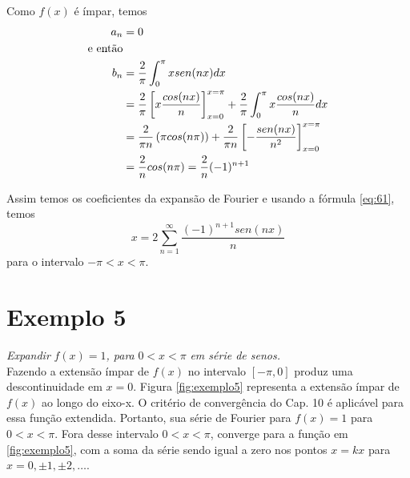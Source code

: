 Como $f(x)$ é ímpar, temos
\begin{equation}
    \notag
    \begin{split}
        a_n &= 0\\
        \text{e então}&\\
        b_n &= \dfrac{2}{\pi}\int_{0}^{\pi}x sen(nx)dx\\
        &= \dfrac{2}{\pi}\left[x \dfrac{cos(nx)}{n}\right]_{x=0}^{x=\pi} + \dfrac{2}{\pi}\int_{0}^{\pi}x \dfrac{cos(nx)}{n}dx\\
        &= \dfrac{2}{\pi n} \left(\pi cos(n\pi)\right) + \dfrac{2}{\pi n}\left[-\dfrac{sen(nx)}{n^2}\right]_{x=0}^{x=\pi}\\
        &= \dfrac{2}{n} cos(n\pi) = \dfrac{2}{n} (-1)^{n+1}
    \end{split}
\end{equation}

Assim temos os coeficientes da expansão de Fourier e usando a fórmula \ref{eq:61}, temos
\begin{equation}
\label{eq:exemplo4SF}
    x = 2\sum\limits_{n=1}^{\infty}\dfrac{(-1)^{n + 1}sen(nx)}{n}
\end{equation}
para o intervalo $ -\pi < x < \pi$.


\section*{Exemplo 5}
\textit{Expandir }$f(x) = 1$\textit{, para }$0 < x < \pi$\textit{ em série de senos.}\\

Fazendo a extensão ímpar de $f(x)$ no intervalo $[-\pi, 0]$ produz uma descontinuidade em 
$x = 0$. Figura \ref{fig:exemplo5} representa a extensão ímpar de $f(x)$ ao longo do eixo-x.
O critério de convergência do Cap. 10 é aplicável para essa função extendida. Portanto,
sua série de Fourier para $f(x) = 1$ para $0 < x < \pi$. Fora desse intervalo $0 < x < \pi$,
converge para a função em \ref{fig:exemplo5}, com a soma da série sendo igual a zero nos pontos
$x = kx$ para $x = 0, \pm 1, \pm 2, \ldots$.

